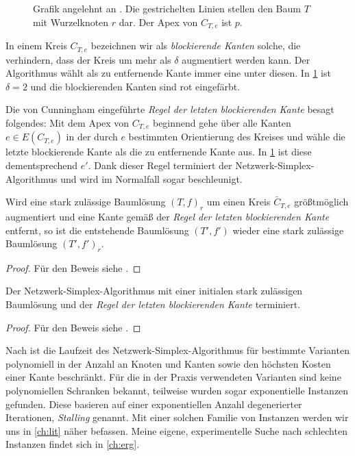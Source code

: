 \begin{figure}[!ht]\centering
    
    \caption{Grafik angelehnt an \cite[S. 372]{GNA}. Die gestrichelten Linien stellen den Baum $T$ mit Wurzelknoten $r$ dar. Der Apex von $C_{T,e}$ ist $p$.}
    \label{fig:rule}
\end{figure}

In einem Kreis $C_{T,e}$ bezeichnen wir als \emph{blockierende Kanten} solche, die verhindern, dass der Kreis um mehr als $\delta$ augmentiert werden kann. Der Algorithmus wählt als zu entfernende Kante immer eine unter diesen. In \cref{fig:rule} ist $\delta=2$ und die blockierenden Kanten sind rot eingefärbt.

Die von Cunningham eingeführte \emph{Regel der letzten blockierenden Kante} besagt folgendes: Mit dem Apex von $C_{T,e}$ beginnend gehe über alle Kanten $e\in E(C_{T,e})$ in der durch $e$ bestimmten Orientierung des Kreises und wähle die letzte blockierende Kante als die zu entfernende Kante aus. In \cref{fig:rule} ist diese dementsprechend $e'$. Dank dieser Regel terminiert der Netzwerk-Simplex-Algorithmus und wird im Normalfall sogar beschleunigt. 
 
\begin{lem}
Wird eine stark zulässige Baumlösung $(T,f)_r$ um einen Kreis $\bar{C}_{T,e}$ größtmöglich augmentiert und eine Kante gemäß  der \emph{Regel der letzten blockierenden Kante} entfernt, so ist die entstehende Baumlösung $(T',f')$ wieder eine stark zulässige Baumlösung $(T',f')_r$.\end{lem}
\begin{proof}Für den Beweis siehe \cite[S. 108\,f.]{cycling}. 
\end{proof}

\begin{thm}
Der Netzwerk-Simplex-Algorithmus mit einer initialen stark zulässigen Baumlösung und der \emph{Regel der letzten blockierenden Kante} terminiert.\end{thm}
\begin{proof}Für den Beweis siehe \cite[S. 108\,f.]{cycling}. 
\end{proof}

Nach \cite[S. 359]{GNA} ist die Laufzeit des Netzwerk-Simplex-Algorithmus für bestimmte Varianten polynomiell in der Anzahl an Knoten und Kanten sowie den höchsten Kosten einer Kante beschränkt. Für die in der Praxis verwendeten Varianten sind keine polynomiellen Schranken bekannt, teilweise wurden sogar exponentielle Instanzen gefunden. Diese basieren auf einer exponentiellen Anzahl degenerierter Iterationen, \emph{Stalling} genannt. Mit einer solchen Familie von Instanzen werden wir uns in \cref{ch:lit} näher befassen. Meine eigene, experimentelle Suche nach schlechten Instanzen findet sich in \cref{ch:erg}.


